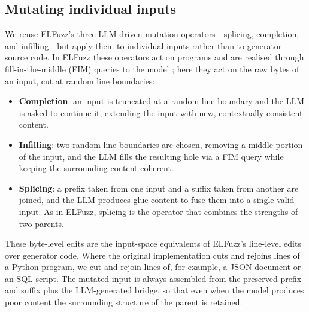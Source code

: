 \subsection{Mutating individual inputs}
\label{sec:mutation}

We reuse ELFuzz's three LLM-driven mutation operators - splicing, completion, and infilling - but apply them to individual inputs rather than to generator source code. In ELFuzz these operators act on programs and are realised through fill-in-the-middle (FIM) queries to the model \cite{chen_2025_elfuzz}; here they act on the raw bytes of an input, cut at random line boundaries:

\begin{itemize}
    \item \textbf{Completion}: an input is truncated at a random line boundary and the LLM is asked to continue it, extending the input with new, contextually consistent content.
    \item \textbf{Infilling}: two random line boundaries are chosen, removing a middle portion of the input, and the LLM fills the resulting hole via a FIM query while keeping the surrounding content coherent.
    \item \textbf{Splicing}: a prefix taken from one input and a suffix taken from another are joined, and the LLM produces glue content to fuse them into a single valid input. As in ELFuzz, splicing is the operator that combines the strengths of two parents.
\end{itemize}

These byte-level edits are the input-space equivalents of ELFuzz's line-level edits over generator code. Where the original implementation cuts and rejoins lines of a Python program, we cut and rejoin lines of, for example, a JSON document or an SQL script. The mutated input is always assembled from the preserved prefix and suffix plus the LLM-generated bridge, so that even when the model produces poor content the surrounding structure of the parent is retained.

